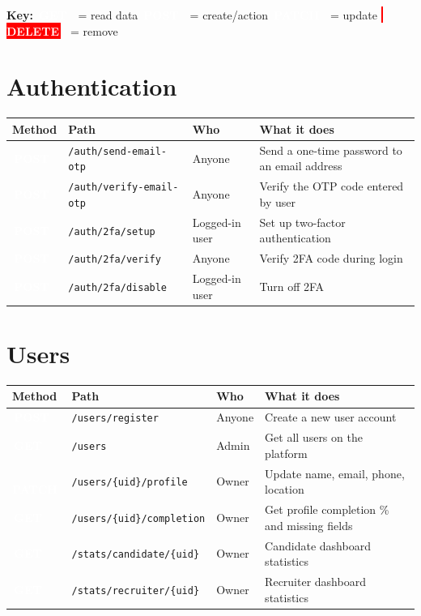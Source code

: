 \documentclass[12pt, a4paper]{report}
\newcommand{\code}[1]{\texttt{\small #1}}
\newcommand{\badge}[2]{%
  \colorbox{#1}{\textcolor{white}{\tiny\bfseries\,#2\,}}%
}
\newcommand{\GET}{\badge{successgr}{GET}}
\newcommand{\POST}{\badge{infoblue}{POST}}
\newcommand{\PATCH}{\badge{warnorange}{PATCH}}
\newcommand{\DELETE}{\badge{red}{DELETE}}
\begin{document}
\textbf{Key:} \GET\ = read data\quad \POST\ = create/action\quad
\PATCH\ = update\quad \DELETE\ = remove

{\small\setlength{\tabcolsep}{4pt}

\section{Authentication}

\begin{longtable}{p{1.5cm}p{5.5cm}p{2.2cm}p{5.5cm}}
\toprule
\textbf{Method} & \textbf{Path} & \textbf{Who} & \textbf{What it does} \\
\midrule
\endhead
\POST & \code{/auth/send-email-otp} & Anyone & Send a one-time password to an email address \\
\POST & \code{/auth/verify-email-otp} & Anyone & Verify the OTP code entered by user \\
\POST & \code{/auth/2fa/setup} & Logged-in user & Set up two-factor authentication \\
\POST & \code{/auth/2fa/verify} & Anyone & Verify 2FA code during login \\
\POST & \code{/auth/2fa/disable} & Logged-in user & Turn off 2FA \\
\bottomrule
\end{longtable}

\section{Users}

\begin{longtable}{p{1.5cm}p{5.5cm}p{2.2cm}p{5.5cm}}
\toprule
\textbf{Method} & \textbf{Path} & \textbf{Who} & \textbf{What it does} \\
\midrule
\endhead
\POST  & \code{/users/register}         & Anyone  & Create a new user account \\
\GET   & \code{/users}                  & Admin   & Get all users on the platform \\
\PATCH & \code{/users/\{uid\}/profile}  & Owner   & Update name, email, phone, location \\
\GET   & \code{/users/\{uid\}/completion}& Owner  & Get profile completion \% and missing fields \\
\GET   & \code{/stats/candidate/\{uid\}}& Owner   & Candidate dashboard statistics \\
\GET   & \code{/stats/recruiter/\{uid\}}& Owner   & Recruiter dashboard statistics \\
\bottomrule
\end{longtable}

}
\end{document}
